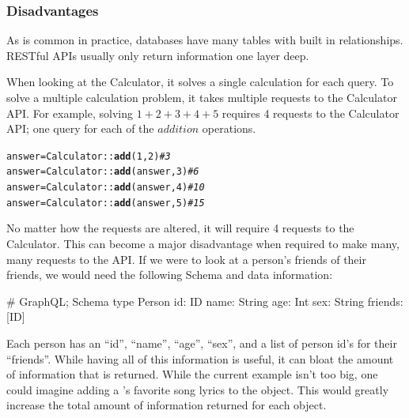 \documentclass[stat,dissertation]{puthesis}\usepackage[]{graphicx}\usepackage{xcolor}
\makeatletter
\newcommand{\hlnum}[1]{\textcolor[rgb]{0.686,0.059,0.569}{#1}}%
\newcommand{\hlcom}[1]{\textcolor[rgb]{0.678,0.584,0.686}{\textit{#1}}}%
\newcommand{\hlopt}[1]{\textcolor[rgb]{0,0,0}{#1}}%
\newcommand{\hlstd}[1]{\textcolor[rgb]{0.345,0.345,0.345}{#1}}%
\newcommand{\hlkwb}[1]{\textcolor[rgb]{0.69,0.353,0.396}{#1}}%
\newcommand{\hlkwd}[1]{\textcolor[rgb]{0.737,0.353,0.396}{\textbf{#1}}}%
\newenvironment{kframe}{%
 \def\at@end@of@kframe{}%
 \ifinner\ifhmode%
  \def\at@end@of@kframe{\end{minipage}}%
  \begin{minipage}{\columnwidth}%
 \fi\fi%
 \def\FrameCommand##1{\hskip\@totalleftmargin \hskip-\fboxsep
 \colorbox{shadecolor}{##1}\hskip-\fboxsep
     \hskip-\linewidth \hskip-\@totalleftmargin \hskip\columnwidth}%
 \MakeFramed {\advance\hsize-\width
   \@totalleftmargin\z@ \linewidth\hsize
   \@setminipage}}%
 {\par\unskip\endMakeFramed%
 \at@end@of@kframe}
\newenvironment{knitrout}{}{} %
\renewenvironment{knitrout}{\setstretch{1}}{}
\makeatother
\begin{document}
\subsubsection{Disadvantages}

As is common in practice, databases have many tables with built in relationships. RESTful APIs usually only return information one layer deep.

When looking at the Calculator, it solves a single calculation for each query.  To solve a multiple calculation problem, it takes multiple requests to the Calculator API.  For example, solving $1 + 2 + 3 + 4 + 5$ requires 4 requests to the Calculator API; one query for each of the $addition$ operations.

\begin{knitrout}\small
{}\color{fgcolor}\begin{kframe}
\begin{alltt}
\hlstd{answer} \hlkwb{=} \hlstd{Calculator}\hlopt{::}\hlkwd{add}\hlstd{(}\hlnum{1}\hlstd{,} \hlnum{2}\hlstd{)} \hlcom{# 3}
\hlstd{answer} \hlkwb{=} \hlstd{Calculator}\hlopt{::}\hlkwd{add}\hlstd{(answer,} \hlnum{3}\hlstd{)} \hlcom{# 6}
\hlstd{answer} \hlkwb{=} \hlstd{Calculator}\hlopt{::}\hlkwd{add}\hlstd{(answer,} \hlnum{4}\hlstd{)} \hlcom{# 10}
\hlstd{answer} \hlkwb{=} \hlstd{Calculator}\hlopt{::}\hlkwd{add}\hlstd{(answer,} \hlnum{5}\hlstd{)} \hlcom{# 15}
\end{alltt}
\end{kframe}
\end{knitrout}

No matter how the requests are altered, it will require 4 requests to the Calculator.  This can become a major disadvantage when required to make many, many requests to the API.  If we were to look at a person's friends of their friends, we would need the following Schema and data information:

\begin{graphqlcode}
# GraphQL; Schema
type Person {
  id: ID
  name: String
  age: Int
  sex: String
  friends: [ID]
}
\end{graphqlcode}

Each person has an ``id'', ``name'', ``age'', ``sex'', and a list of person id's for their ``friends''.  While having all of this information is useful, it can bloat the amount of information that is returned.  While the current example isn't too big, one could imagine adding a 's favorite song lyrics to the  object.  This would greatly increase the total amount of information returned for each  object.
\end{document}

